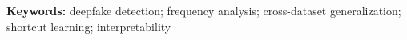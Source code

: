 \documentclass[12pt,a4paper]{article}
\begin{document}
\vspace{1em}
\noindent\textbf{Keywords:} deepfake detection; frequency analysis; cross-dataset generalization;
shortcut learning; interpretability

\newpage
\tableofcontents
\newpage










\end{document}
